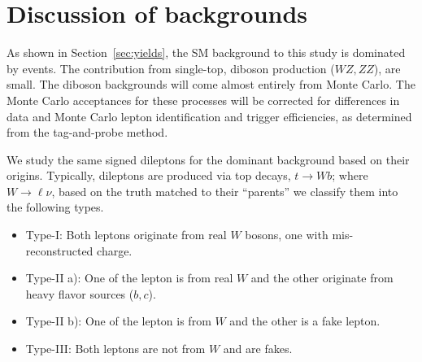 \section{Discussion of backgrounds}
\label{sec:bkgtypes}

As shown in Section~\ref{sec:yields}, the SM background to this study is dominated 
by \ttbar events. The contribution from single-top, diboson production ($WZ, ZZ$), 
are small. The diboson backgrounds will come almost entirely from Monte Carlo. 
The Monte Carlo acceptances for these processes will be corrected for differences in 
data and Monte Carlo lepton identification and trigger efficiencies, as determined from 
the tag-and-probe method.

We study the same signed dileptons for the dominant \ttbar background based on their origins.
Typically, dileptons are produced via top decays, $t \rightarrow W b$; where 
$W \rightarrow \ell \nu $, based on the truth matched to their ``parents'' we classify them 
into the following types.

\begin{itemize}
\item Type-I: Both leptons originate from real $W$ bosons, one with mis-reconstructed charge.
\item Type-II a): One of the lepton is from real $W$ and the other originate from heavy flavor sources ($b, c$).
\item Type-II b): One of the lepton is from $W$ and the other is a fake lepton.
\item Type-III: Both leptons are not from $W$ and are fakes.
\end{itemize} 

